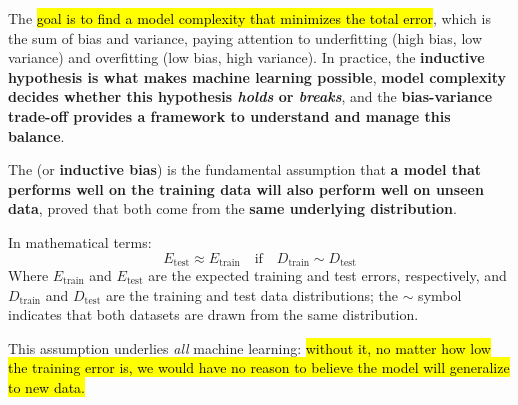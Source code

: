 The \hl{goal is to find a model complexity that minimizes the total error}, which is the sum of bias and variance, paying attention to underfitting (high bias, low variance) and overfitting (low bias, high variance). In practice, the \textbf{inductive hypothesis is what makes machine learning possible}, \textbf{model complexity decides whether this hypothesis \emph{holds} or \emph{breaks}}, and the \textbf{bias-variance trade-off provides a framework to understand and manage this balance}.

\highspace
\begin{definitionbox}
    The  (or \textbf{inductive bias}) is the fundamental assumption that \textbf{a model that performs well on  the training data will also perform well on unseen data}, proved that both come from the \textbf{same underlying distribution}.

    \highspace
    In mathematical terms:
    \begin{equation}
        E_{\text{test}} \approx E_{\text{train}} \quad \text{if} \quad
        D_{\text{train}} \sim D_{\text{test}}
    \end{equation}
    Where $E_{\text{train}}$ and $E_{\text{test}}$ are the expected training and test errors, respectively, and $D_{\text{train}}$ and $D_{\text{test}}$ are the training and test data distributions; the $\sim$ symbol indicates that both datasets are drawn from the same distribution.

    \highspace
    This assumption underlies \emph{all} machine learning: \hl{without it, no matter how low the training error is, we would have no reason to believe the model will generalize to new data.}
\end{definitionbox}

